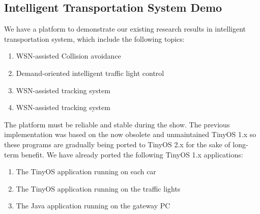 
\subsection{Intelligent Transportation System Demo}

We have a platform to demonstrate our existing research results in intelligent transportation system, which include the following topics:

\begin{enumerate}
  \item WSN-assisted Collision avoidance
  \item Demand-oriented intelligent traffic light control
  \item WSN-assisted tracking system
  \item WSN-assisted tracking system
\end{enumerate}

The platform must be reliable and stable during the show. The previous implementation was based on the now obsolete and unmaintained TinyOS 1.x so these programs are gradually being ported to TinyOS 2.x for the sake of long-term benefit. We have already ported the following TinyOS 1.x applications:

\begin{enumerate}
  \item The TinyOS application running on each car
  \item The TinyOS application running on the traffic lights
  \item The Java application running on the gateway PC
\end{enumerate}
